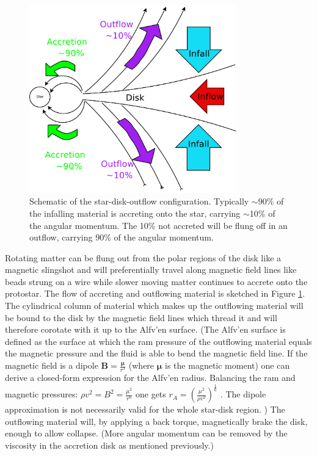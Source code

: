\begin{figure}[t]
\centering
\includegraphics[width=0.8\textwidth]{MagneticSlingshot}
\caption{
Schematic of the star-disk-outflow configuration. Typically $\sim$90\% of the infalling material is accreting onto the star, carrying $\sim$10\% of the angular momentum. The 10\% not accreted will be flung off in an outflow, carrying 90\% of the angular momentum.
}
\label{fig:MagneticSlingshot} %
\end{figure}

Rotating matter can be flung out from the polar regions of the disk like a
magnetic slingshot and will preferentially travel along magnetic field lines
like beads strung on a wire \citep{1971MNRAS.152..323H} while slower moving matter continues to accrete onto the protostar.
The flow of accreting and outflowing material is sketched in Figure \ref{fig:MagneticSlingshot}.
The cylindrical column of material which makes up the outflowing material will
be bound to the disk by the magnetic field lines which thread it and will
therefore corotate with it up to the Alfv\a'{e}n surface.
(The Alfv\a'{e}n surface is defined as the surface at which the ram pressure of
the outflowing  material equals the magnetic pressure and the fluid is able to bend the magnetic field line.
If the magnetic field is a dipole 
$\mathbf{B}=\frac{\boldsymbol{\mu}}{r^3}$
(where $ \boldsymbol{\mu}$ is the magnetic moment)
one can derive a closed-form expression for
the Alfv\a'{e}n radius. 
Balancing the ram and magnetic pressures:
$
\rho v^2 = B^2 = \frac{\mu^2}{r^6}
$
one gets
$
r_A= \left( \frac{\mu^2}{\rho v^2}\right)^\frac{1}{6}
$
.
The dipole approximation is not necessarily valid for the whole star-disk region.
)
The outflowing material will, by applying a back torque, magnetically brake the disk, enough to allow collapse. (More angular momentum can be removed by the viscosity in the accretion disk as mentioned previously.)

